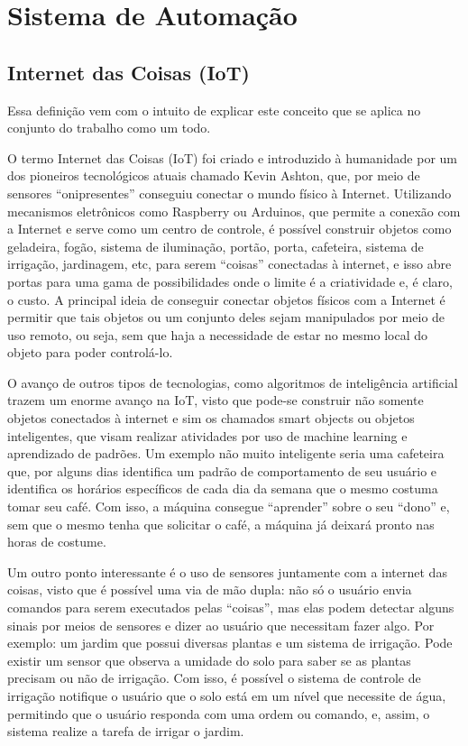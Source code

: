 \chapter{Sistema de Automação}
\section{Internet das Coisas (IoT)}
\par Essa definição vem com o intuito de explicar este conceito que se aplica no conjunto do trabalho como um todo.
\par O termo Internet das Coisas (IoT) foi criado e introduzido à humanidade por um dos pioneiros tecnológicos atuais chamado Kevin Ashton, que, por meio de sensores “onipresentes” conseguiu conectar o mundo físico à Internet. Utilizando mecanismos eletrônicos como Raspberry ou Arduinos, que permite a conexão com a Internet e serve como um centro de controle, é possível construir objetos como geladeira, fogão, sistema de iluminação, portão, porta, cafeteira, sistema de irrigação, jardinagem, etc, para serem “coisas” conectadas à internet, e isso abre portas para uma gama de possibilidades onde o limite é a criatividade e, é claro, o custo. A principal ideia de conseguir conectar objetos físicos com a Internet é permitir que tais objetos ou um conjunto deles sejam manipulados por meio de uso remoto, ou seja, sem que haja a necessidade de estar no mesmo local do objeto para poder controlá-lo.
\par O avanço de outros tipos de tecnologias, como algoritmos de inteligência artificial trazem um enorme avanço na IoT, visto que pode-se construir não somente objetos conectados à internet e sim os chamados smart objects ou objetos inteligentes, que visam realizar atividades por uso de machine learning e aprendizado de padrões. Um exemplo não muito inteligente seria uma cafeteira que, por alguns dias identifica um padrão de comportamento de seu usuário e identifica os horários específicos de cada dia da semana que o mesmo costuma tomar seu café. Com isso, a máquina consegue “aprender” sobre o seu “dono” e, sem que o mesmo tenha que solicitar o café, a máquina já deixará pronto nas horas de costume.
\par Um outro ponto interessante é o uso de sensores juntamente com a internet das coisas, visto que é possível uma via de mão dupla: não só o usuário envia comandos para serem executados pelas “coisas”, mas elas podem detectar alguns sinais por meios de sensores e dizer ao usuário que necessitam fazer algo. Por exemplo: um jardim que possui diversas plantas e um sistema de irrigação. Pode existir um sensor que observa a umidade do solo para saber se as plantas precisam ou não de irrigação. Com isso, é possível o sistema de controle de irrigação notifique o usuário que o solo está em um nível que necessite de água, permitindo que o usuário responda com uma ordem ou comando, e, assim, o sistema realize a tarefa de irrigar o jardim.

